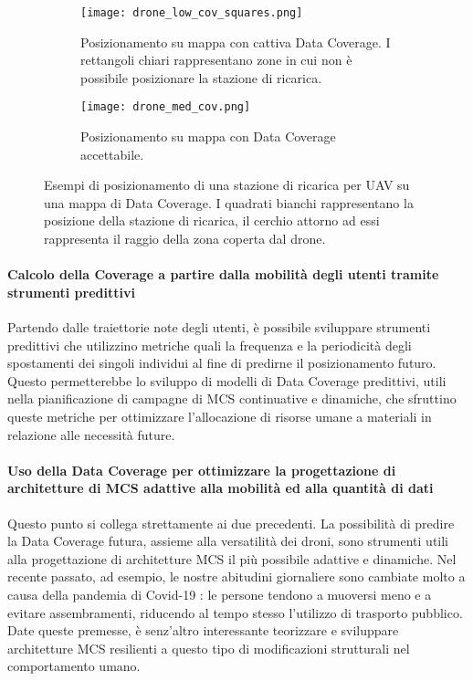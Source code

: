 \begin{figure}
	\centering
	\begin{subfigure}[b]{\linewidth}
		\texttt{[image: drone\_low\_cov\_squares.png]}
		\caption{Posizionamento su mappa con cattiva Data Coverage. I rettangoli chiari rappresentano zone in cui non è possibile posizionare la stazione di ricarica.}
	\end{subfigure}
	\begin{subfigure}[b]{\linewidth}
		\texttt{[image: drone\_med\_cov.png]}
		\caption{Posizionamento su mappa con Data Coverage accettabile.}
	\end{subfigure}
	\caption[Posizionamento di UAV Base Stations]{Esempi di posizionamento di una stazione di ricarica per UAV su una mappa di Data Coverage. I quadrati bianchi rappresentano la posizione della stazione di ricarica, il cerchio attorno ad essi rappresenta il raggio della zona coperta dal drone.}
	\label{fig:uav_stations}
\end{figure}

\paragraph{Calcolo della Coverage a partire dalla mobilità degli utenti tramite strumenti predittivi}
Partendo dalle traiettorie note degli utenti, è possibile sviluppare strumenti predittivi che utilizzino metriche quali la frequenza e la periodicità degli spostamenti dei singoli individui al fine di predirne il posizionamento futuro. Questo permetterebbe lo sviluppo di modelli di Data Coverage predittivi, utili nella pianificazione di campagne di MCS continuative e dinamiche, che sfruttino queste metriche per ottimizzare l'allocazione di risorse umane a materiali in relazione alle necessità future. 

\paragraph{Uso della Data Coverage per ottimizzare la progettazione di architetture di MCS adattive alla mobilità ed alla quantità di dati}
Questo punto si collega strettamente ai due precedenti. La possibilità di predire la Data Coverage futura, assieme alla versatilità dei droni, sono strumenti utili alla progettazione di architetture MCS il più possibile adattive e dinamiche. Nel recente passato, ad esempio, le nostre abitudini giornaliere sono cambiate molto a causa della pandemia di Covid-19 \cite{DiRenzo2020}: le persone tendono a muoversi meno e a evitare assembramenti, riducendo al tempo stesso l'utilizzo di trasporto pubblico. Date queste premesse, è senz'altro interessante teorizzare e sviluppare architetture MCS resilienti a questo tipo di modificazioni strutturali nel comportamento umano.